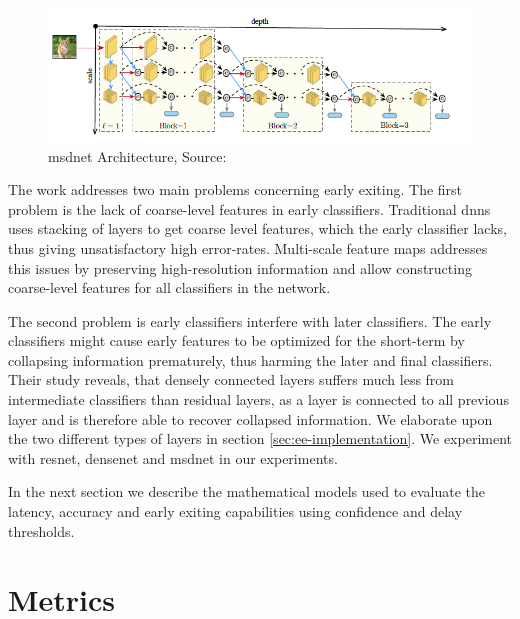 \begin{figure}
	\centering
	\includegraphics[width=\linewidth]{figures/models/msdnet}
	\caption[\gls{msdnet} Architecture]{\gls{msdnet} Architecture, Source:  \cite{huang_multi-scale_2017}}
	\label{fig:msdnet}
\end{figure}

The work addresses two main problems concerning early exiting. The first problem is the lack of coarse-level features in early classifiers. Traditional \gls{dnn}s uses stacking of layers to get coarse level features, which the early classifier lacks, thus giving unsatisfactory high error-rates. Multi-scale feature maps addresses this issues by preserving high-resolution information and allow constructing coarse-level features for all classifiers in the network.

The second problem is early classifiers interfere with later classifiers. The early classifiers might cause early features to be optimized for the short-term by collapsing information prematurely, thus harming the later and final classifiers. Their study reveals, that densely connected layers suffers much less from intermediate classifiers than residual layers, as a layer is connected to all previous layer and is therefore able to recover collapsed information. We elaborate upon the two different types of layers in section \ref{sec:ee-implementation}. We experiment with \gls{resnet}, \gls{densenet} and \gls{msdnet} in our experiments.

In the next section we describe the mathematical models used to evaluate the latency, accuracy and early exiting capabilities using confidence and delay thresholds.

\section{Metrics} \label{sec:ee-metrics}

